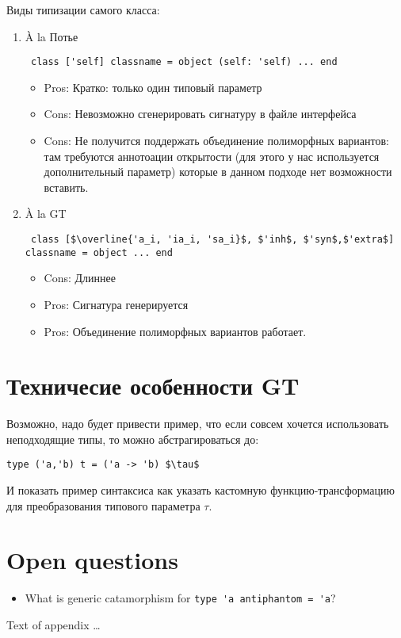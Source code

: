 \documentclass[acmsmall,review,anonymous]{acmart}\settopmatter{printfolios=true,printccs=false,printacmref=false}
\begin{document}
Виды типизации самого класса:
\begin{enumerate}
 \item À la Потье
 \begin{lstlisting}
 class ['self] classname = object (self: 'self) ... end
 \end{lstlisting}
    \begin{itemize}
    \item Pros: Кратко: только один типовый параметр
    \item Cons: Невозможно сгенерировать сигнатуру в файле интерфейса
    \item Cons: Не получится поддержать объединение полиморфных вариантов: там требуются аннотоации открытости (для этого у нас используется дополнительный параметр) которые в данном подходе нет возможности вставить.
    \end{itemize}
 

 \item À la GT
 \begin{lstlisting}
 class [$\overline{'a_i, 'ia_i, 'sa_i}$, $'inh$, $'syn$,$'extra$] classname = object ... end
 \end{lstlisting}
 \begin{itemize}
    \item Cons: Длиннее
    \item Pros: Сигнатура генерируется 
    \item Pros: Объединение полиморфных вариантов работает.
    \end{itemize}
 
\end{enumerate}

\section{Техничесие особенности GT}
Возможно, надо будет привести пример, что если совсем хочется использовать неподходящие типы, то можно абстрагироваться до:
\begin{lstlisting}
type ('a,'b) t = ('a -> 'b) $\tau$
\end{lstlisting}
И показать пример синтаксиса как указать кастомную функцию-трансформацию для преобразования типового параметра $\tau$.
 
\section{Open questions}
\begin{itemize}
 \item What is generic catamorphism for \lstinline{type 'a antiphantom = 'a}? 
\end{itemize}


%


Text of appendix \ldots
\end{document}

